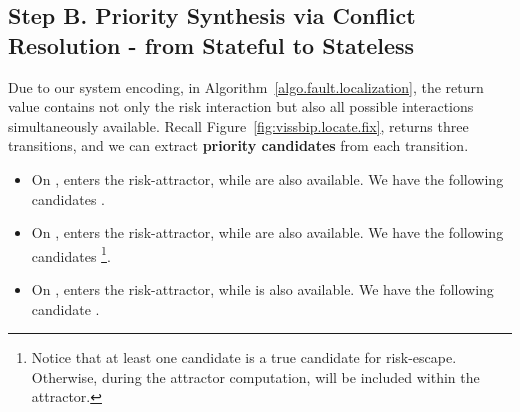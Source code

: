 \documentclass[10pt, a4paper, onecolumn, conference, compsocconf]{IEEEtran}
\begin{document}
\subsection{Step B. Priority Synthesis via Conflict Resolution \label{subsec.algo.prioritysyn.repair} - from Stateful to Stateless} 

Due to our system encoding, in
Algorithm~\ref{algo.fault.localization}, the return value
 contains not only the risk interaction but also all
possible interactions simultaneously available. Recall Figure~\ref{fig:vissbip.locate.fix},
 returns three transitions, and we can extract \textbf{priority candidates} from each transition.
\begin{itemize}
    \item On ,  enters the risk-attractor, while  are also available. We have the following candidates .
    \item On ,  enters the risk-attractor, while  are also available. We have the following candidates \footnote{Notice that at least one candidate is a true candidate for risk-escape. Otherwise, during the attractor computation,  will be included within the attractor.}.
    \item On ,  enters the risk-attractor, while  is also available. We have the following candidate .
\end{itemize}
\end{document}
